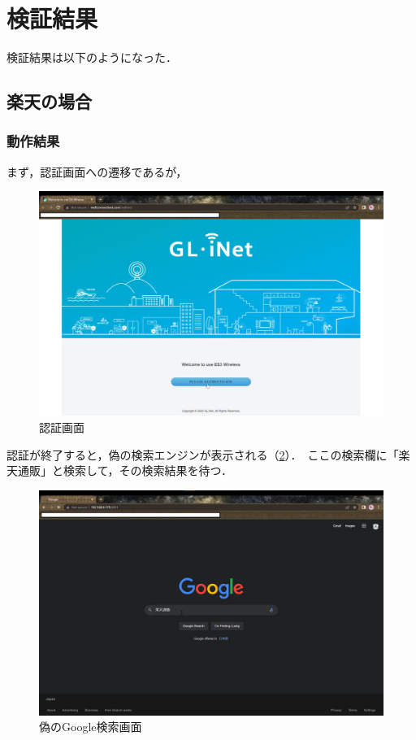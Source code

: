 \documentclass[dvipdfmx]{jsarticle}
\begin{document}
        \section{検証結果}
            検証結果は以下のようになった．
            \subsection{楽天の場合}
                \subsubsection{動作結果}
                    まず，認証画面への遷移であるが，
                    \begin{figure}[pth]
                        \centering
                        \includegraphics[width=15cm]{img/rakuten/rakuten-00.png}
                        \caption{認証画面}
                        \label{rakuten-00}
                    \end{figure}
                    認証が終了すると，偽の検索エンジンが表示される（\ref{rakuten-01}）．\
                    ここの検索欄に「楽天通販」と検索して，その検索結果を待つ．\
                    \begin{figure}[pth]
                        \centering
                        \includegraphics[width=15cm]{img/rakuten/rakuten-01.png}
                        \caption{偽のGoogle検索画面}
                        \label{rakuten-01}
                    \end{figure}
\end{document}
